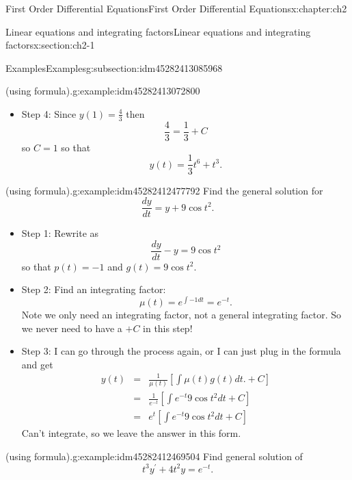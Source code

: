\documentclass[oneside,10pt,]{book}
\numberwithin{equation}{section}
\numberwithin{equation}{section}
\newcommand{\amp}{&}
\begin{document}
\begin{chapterptx}{First Order Differential Equations}{}{First Order Differential Equations}{}{}{x:chapter:ch2}
\begin{sectionptx}{Linear equations and integrating factors}{}{Linear equations and integrating factors}{}{}{x:section:ch2-1}
\begin{subsectionptx}{Examples}{}{Examples}{}{}{g:subsection:idm45282413085968}
\begin{example}{(using formula).}{g:example:idm45282413072800}
\begin{itemize}[label=\textbullet]
\begin{align*}
\amp = \amp t^{3}\left[\int\frac{1}{t^{3}}t^{5}dt+C\right]\\
\amp = \amp t^{3}\left[\frac{t^{3}}{3}+C\right]=\frac{1}{3}t^{6}+Ct^{3}.
\end{align*}
%
\item{}Step 4: Since \(y(1)=\frac{4}{3}\) then%
\begin{equation*}
\frac{4}{3}=\frac{1}{3}+C
\end{equation*}
so \(C=1\) so that%
\begin{equation*}
y(t)=\frac{1}{3}t^{6}+t^{3}.
\end{equation*}
%
\end{itemize}
\end{example}
\begin{example}{(using formula).}{g:example:idm45282412477792}%
Find the general solution for%
\begin{equation*}
\frac{dy}{dt}=y+9\cos t^{2}.
\end{equation*}
%
%
\begin{itemize}[label=\textbullet]
\item{}Step 1: Rewrite as%
\begin{equation*}
\frac{dy}{dt}-y=9\cos t^{2}
\end{equation*}
so that \(p(t)=-1\) and \(g(t)=9\cos t^{2}\).%
\item{}Step 2: Find an integrating factor:%
\begin{equation*}
\mu(t)=e^{\int-1dt}=e^{-t}.
\end{equation*}
Note we only need an integrating factor, not a general integrating factor. So we never need to have a \(+C\) in this step!%
\item{}Step 3: I can go through the process again, or I can just plug in the formula and get%
\begin{align*}
y(t) \amp = \amp \frac{1}{\mu(t)}\left[\int\mu(t)g(t)dt.+C\right]\\
\amp = \amp \frac{1}{e^{-t}}\left[\int e^{-t}9\cos t^{2}dt+C\right]\\
\amp = \amp e^{t}\left[\int e^{-t}9\cos t^{2}dt+C\right]
\end{align*}
Can't integrate, so we leave the answer in this form.%
\end{itemize}
\end{example}
\begin{example}{(using formula).}{g:example:idm45282412469504}%
Find general solution of%
\begin{equation*}
t^{3}y^{\prime}+4t^{2}y=e^{-t}.
\end{equation*}

\end{example}
\end{subsectionptx}
\end{sectionptx}
\end{chapterptx}
\end{document}
